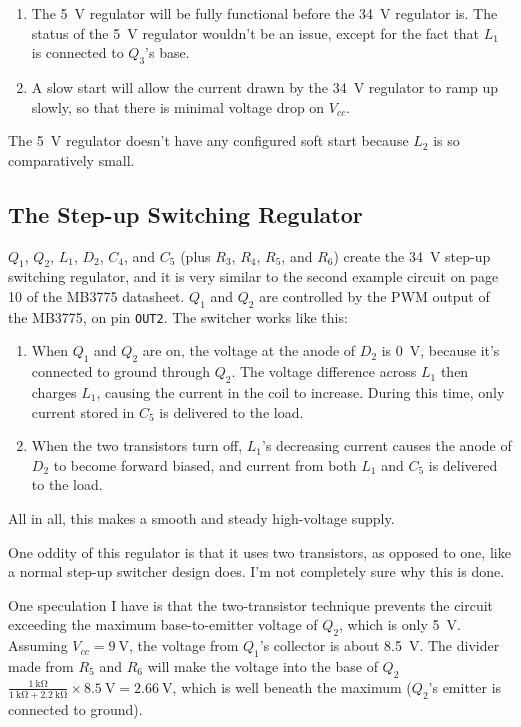 \documentclass{article}
\newcommand{\Vcc}{$V_{cc}$}
\newcommand{\chippin}{\texttt}
\newcommand{\model}{\textsf}
\begin{document}
\begin{enumerate}
\item The \qty{5}{\volt} regulator will be fully functional before the
  \qty{34}{\volt} regulator is. The status of the \qty{5}{\volt}
  regulator wouldn't be an issue, except for the fact that $L_1$ is
  connected to $Q_3$'s base.
\item A slow start will allow the current drawn by the \qty{34}{\volt}
  regulator to ramp up slowly, so that there is minimal voltage drop
  on \Vcc{}. 
\end{enumerate}

The \qty{5}{\volt} regulator doesn't have any configured soft start
because $L_2$ is so comparatively small.

\subsection{The Step-up Switching Regulator}
\label{sec:step-up_regulator}
$Q_1$, $Q_2$, $L_1$, $D_2$, $C_4$, and $C_5$ (plus $R_3$, $R_4$,
$R_5$, and $R_6$) create the \qty{34}{\volt} step-up switching
regulator, and it is very similar to the second example circuit on
page 10 of the \model{MB3775} datasheet. $Q_1$ and $Q_2$ are
controlled by the PWM output of the \model{MB3775}, on pin
\chippin{OUT2}. The switcher works like this:

\begin{enumerate}
\item When $Q_1$ and $Q_2$ are on, the voltage at the anode of $D_2$
  is \qty{0}{\volt}, because it's connected to ground through
  $Q_2$. The voltage difference across $L_1$ then charges $L_1$,
  causing the current in the coil to increase. During this time, only
  current stored in $C_5$ is delivered to the load.
\item When the two transistors turn off, $L_1$'s decreasing current
  causes the anode of $D_2$ to become forward biased, and current from
  both $L_1$ and $C_5$ is delivered to the load.
\end{enumerate}

All in all, this makes a smooth and steady high-voltage supply.

One oddity of this regulator is that it uses two transistors, as
opposed to one, like a normal step-up switcher design does. I'm not
completely sure why this is done.

One speculation I have is that the two-transistor technique prevents
the circuit exceeding the maximum base-to-emitter voltage of $Q_2$,
which is only \qty{5}{\volt}. Assuming \Vcc{}$=\qty{9}{\volt}$, the
voltage from $Q_1$'s collector is about \qty{8.5}{\volt}. The divider
made from $R_5$ and $R_6$ will make the voltage into the base of $Q_2$
$\frac{\qty{1}{\kilo\ohm}}{\qty{1}{\kilo\ohm} +
  \qty{2.2}{\kilo\ohm}}\times{}\qty{8.5}{\volt} = \qty{2.66}{\volt}$,
which is well beneath the maximum ($Q_2$'s emitter is connected to
ground).
\end{document}
